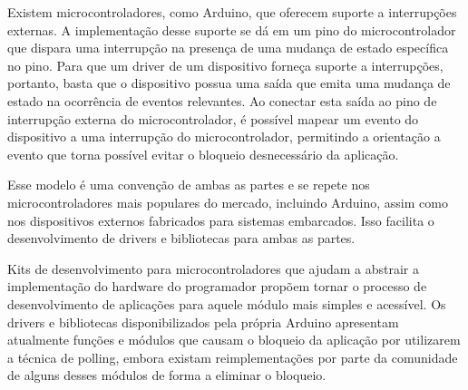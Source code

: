 \documentclass[11pt]{article}
\begin{document}
\par Existem microcontroladores, como Arduino, que oferecem suporte a interrupções externas. A implementação desse suporte se dá em um pino do microcontrolador que dispara uma interrupção na presença de uma mudança de estado específica no pino. Para que um driver de um dispositivo forneça suporte a interrupções, portanto, basta que o dispositivo possua uma saída que emita uma mudança de estado na ocorrência de eventos relevantes. Ao conectar esta saída ao pino de interrupção externa do microcontrolador, é possível mapear um evento do dispositivo a uma interrupção do microcontrolador, permitindo a orientação a evento que torna possível evitar o bloqueio desnecessário da aplicação.
\par Esse modelo é uma convenção de ambas as partes e se repete nos microcontroladores mais populares do mercado, incluindo Arduino, assim como nos dispositivos externos fabricados para sistemas embarcados. Isso facilita o desenvolvimento de drivers e bibliotecas para ambas as partes.
\par Kits de desenvolvimento para microcontroladores que ajudam a abstrair a implementação do hardware do programador propõem tornar o processo de desenvolvimento de aplicações para aquele módulo mais simples e acessível. Os drivers e bibliotecas disponibilizados pela própria Arduino apresentam atualmente funções e módulos que causam o bloqueio da aplicação por utilizarem a técnica de polling, embora existam reimplementações por parte da comunidade de alguns desses módulos de forma a eliminar o bloqueio.
\end{document}
